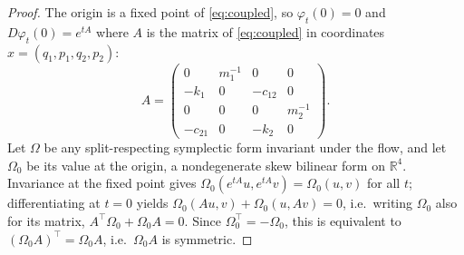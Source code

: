 \documentclass[10pt,a4paper]{article}
\theoremstyle{plain}
\theoremstyle{definition}
\newcommand{\R}{\mathbb{R}}
\begin{document}
\begin{proof}
The origin is a fixed point of \eqref{eq:coupled}, so $\varphi_t(0) = 0$ and $D\varphi_t(0) = e^{tA}$ where $A$ is the matrix of \eqref{eq:coupled} in coordinates $x = (q_1,p_1,q_2,p_2)$:
\[
A = \begin{pmatrix} 0 & m_1^{-1} & 0 & 0\\ -k_1 & 0 & -c_{12} & 0\\ 0 & 0 & 0 & m_2^{-1}\\ -c_{21} & 0 & -k_2 & 0\end{pmatrix}.
\]
Let $\Omega$ be any split-respecting symplectic form invariant under the flow, and let $\Omega_0$ be its value at the origin, a nondegenerate skew bilinear form on $\R^4$. Invariance at the fixed point gives $\Omega_0(e^{tA}u,e^{tA}v) = \Omega_0(u,v)$ for all $t$; differentiating at $t=0$ yields $\Omega_0(Au,v) + \Omega_0(u,Av) = 0$, i.e.\ writing $\Omega_0$ also for its matrix, $A^{\top}\Omega_0 + \Omega_0 A = 0$. Since $\Omega_0^{\top} = -\Omega_0$, this is equivalent to $(\Omega_0A)^{\top} = \Omega_0A$, i.e.\ $\Omega_0A$ is symmetric.


\end{proof}
\end{document}
